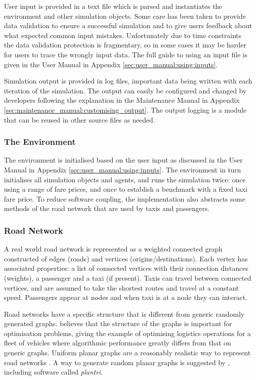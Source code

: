 User input is provided in a text file which is parsed and instantiates the
environment and other simulation objects. Some care has been taken to provide
data validation to ensure a successful simulation and to give users feedback
about what expected common input mistakes. Unfortunately due to time
constraints the data validation protection is fragmentary, so in some cases it
may be harder for users to trace the wrongly input data. The full guide to
using an input file is given in the User Manual in Appendix
\ref{sec:user_manual:using:inputs}.

Simulation output is provided in log files, important data being written with
each iteration of the simulation. The output can easily be configured and
changed by developers following the explanation in the Maintenance Manual in
Appendix \ref{sec:maintenance_manual:customising_output}. The output logging is
a module that can be reused in other source files as needed.


\subsubsection{The Environment}
\label{sec:implementation:software:environment}

The environment is initialised based on the user input as discussed in the User
Manual in Appendix \ref{sec:user_manual:using:inputs}. The environment in turn
initialises all simulation objects and agents, and runs the simulation twice:
once using a range of fare prices, and once to establish a benchmark with a
fixed taxi fare price. To reduce software coupling, the implementation also
abstracts some methods of the road network that are used by taxis and
passengers.


\subsubsection{Road Network}
\label{sec:implementation:software:roads}

A real world road network is represented as a weighted connected graph
constructed of edges (roads) and vertices (origins/destinations). Each vertex
has associated properties: a list of connected vertices with their connection
distances (weights), a passenger and a taxi (if present). Taxis can travel
between connected vertices, and are assumed to take the shortest routes and
travel at a constant speed. Passengers appear at nodes and when taxi is at a
node  they can interact.

Road networks have a specific structure that is different from generic randomly
generated graphs. \textcite{Eisenstat2011graphs+quadtree} believes that the
structure of the graphs is important for optimisation problems, giving the
example of optimising logistics operations for a fleet of vehicles where
algorithmic performance greatly differs from that on generic graphs. Uniform
planar graphs are a reasonably realistic way to represent road networks
\parencite{Eisenstat2011graphs+quadtree, Masucci2009graphs+london}. A way to
generate random planar graphs is suggested by
\textcite{Brinkmann2007graphs+generate}, including software called
\textit{plantri}.

